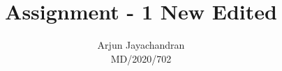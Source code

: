\documentclass[journal,12pt,twocolumn]{IEEEtran}
\begin{document}
%


\newtheorem{theorem}{Theorem}[section]
\newtheorem{problem}{Problem}
\newtheorem{proposition}{Proposition}[section]
\newtheorem{lemma}{Lemma}[section]
\newtheorem{corollary}[theorem]{Corollary}
\newtheorem{example}{Example}[section]
\newtheorem{definition}[problem]{Definition}
\newcommand{\BEQA}{\begin{eqnarray}}
\newcommand{\EEQA}{\end{eqnarray}}
\newcommand{\define}{\stackrel{\triangle}{=}}

\providecommand{\mbf}{\mathbf}
\providecommand{\pr}[1]{\ensuremath{\Pr\left(#1\right)}}
\providecommand{\qfunc}[1]{\ensuremath{Q\left(#1\right)}}
\providecommand{\sbrak}[1]{\ensuremath{{}\left[#1\right]}}
\providecommand{\lsbrak}[1]{\ensuremath{{}\left[#1\right.}}
\providecommand{\rsbrak}[1]{\ensuremath{{}\left.#1\right]}}
\providecommand{\brak}[1]{\ensuremath{\left(#1\right)}}
\providecommand{\lbrak}[1]{\ensuremath{\left(#1\right.}}
\providecommand{\rbrak}[1]{\ensuremath{\left.#1\right)}}
\providecommand{\cbrak}[1]{\ensuremath{\left\{#1\right\}}}
\providecommand{\lcbrak}[1]{\ensuremath{\left\{#1\right.}}
\providecommand{\rcbrak}[1]{\ensuremath{\left.#1\right\}}}
\theoremstyle{remark}
\newtheorem{rem}{Remark}
\newcommand{\sgn}{\mathop{\mathrm{sgn}}}
\providecommand{\abs}[1]{\left\vert#1\right\vert}
\providecommand{\res}[1]{\Res\displaylimits_{#1}} 
\providecommand{\norm}[1]{\left\lVert#1\right\rVert}
\providecommand{\mtx}[1]{\mathbf{#1}}
\providecommand{\mean}[1]{E\left[ #1 \right]}
\providecommand{\fourier}{\overset{\mathcal{F}}{ \rightleftharpoons}}
\providecommand{\system}{\overset{\mathcal{H}}{ \longleftrightarrow}}
\newcommand{\solution}{\noindent \textbf{Solution: }}
\newcommand{\cosec}{\,\text{cosec}\,}
\providecommand{\dec}[2]{\ensuremath{\overset{#1}{\underset{#2}{\gtrless}}}}
\newcommand{\myvec}[1]{\ensuremath{\begin{pmatrix}#1\end{pmatrix}}}
\newcommand{\cmyvec}[1]{\ensuremath{\begin{pmatrix*}[c]#1\end{pmatrix*}}}
\newcommand{\mydet}[1]{\ensuremath{\begin{vmatrix}#1\end{vmatrix}}}
\newcommand{\proj}[2]{\textbf{proj}_{\vec{#1}}\vec{#2}}
\let\StandardTheFigure\thefigure
\let\vec\mathbf
\title{Assignment - 1 New Edited}
\author{Arjun Jayachandran
\\ MD/2020/702}
\maketitle
\end{document}
